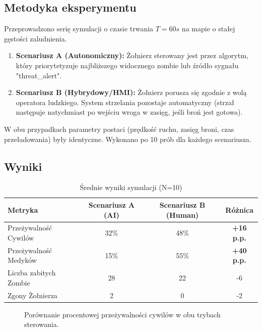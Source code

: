 \documentclass[12pt,a4paper]{article}
\begin{document}
\subsection{Metodyka eksperymentu}
Przeprowadzono serię symulacji o czasie trwania $T=60s$ na mapie o stałej
gęstości zaludnienia.
\begin{enumerate}
    \item \textbf{Scenariusz A (Autonomiczny):} Żołnierz sterowany jest przez algorytm, który priorytetyzuje najbliższego widocznego zombie lub źródło sygnału "threat\_alert".
    \item \textbf{Scenariusz B (Hybrydowy/HMI):} Żołnierz porusza się zgodnie z wolą operatora ludzkiego. System strzelania pozostaje automatyczny (strzał następuje natychmiast po wejściu wroga w zasięg, jeśli broń jest gotowa).
\end{enumerate}

W obu przypadkach parametry postaci (prędkość ruchu, zasięg broni, czas
przeładowania) były identyczne. Wykonano po 10 prób dla każdego scenariusza.

\subsection{Wyniki}

\begin{table}[h]
    \centering
    \caption{Średnie wyniki symulacji (N=10)}
    \begin{tabular}{|l|c|c|c|}
        \hline
        \textbf{Metryka}       & \textbf{Scenariusz A (AI)} & \textbf{Scenariusz B (Human)} & \textbf{Różnica}  \\ \hline
        Przeżywalność Cywilów  & 32\%                       & 48\%                          & \textbf{+16 p.p.} \\ \hline
        Przeżywalność Medyków  & 15\%                       & 55\%                          & \textbf{+40 p.p.} \\ \hline
        Liczba zabitych Zombie & 28                         & 22                            & -6                \\ \hline
        Zgony Żołnierza        & 2                          & 0                             & -2                \\ \hline
    \end{tabular}
\end{table}

\begin{figure}[h]
    \centering
    \caption{Porównanie procentowej przeżywalności cywilów w obu trybach sterowania.}
\end{figure}
\end{document}
